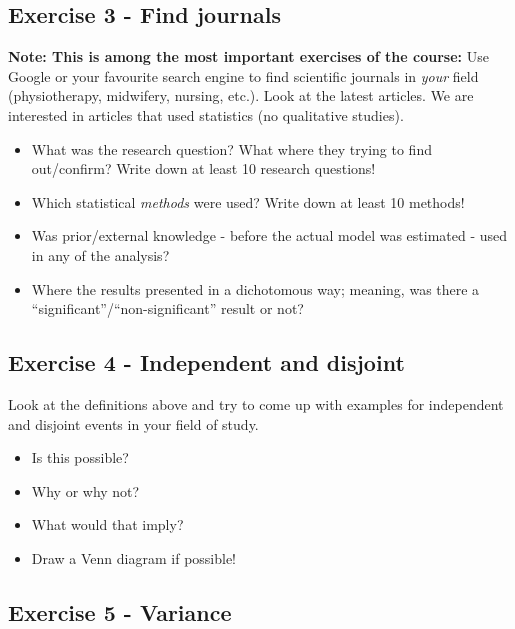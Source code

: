 \documentclass[
]{book}
\providecommand{\tightlist}{%
  \setlength{\itemsep}{0pt}\setlength{\parskip}{0pt}}
\begin{document}
\subsection{Exercise 3 - Find journals}\label{exercise3}

\textbf{Note: This is among the most important exercises of the course:}
Use Google or your favourite search engine to find scientific journals in \emph{your} field (physiotherapy, midwifery, nursing, etc.).
Look at the latest articles. We are interested in articles that used statistics (no qualitative studies).

\begin{itemize}
\tightlist
\item
  What was the research question? What where they trying to find out/confirm? Write down at least 10 research questions!
\item
  Which statistical \emph{methods} were used? Write down at least 10 methods!
\item
  Was prior/external knowledge - before the actual model was estimated - used in any of the analysis?
\item
  Where the results presented in a dichotomous way; meaning, was there a ``significant''/``non-significant'' result or not?
\end{itemize}

\subsection{Exercise 4 - Independent and disjoint}\label{exercise4}

Look at the definitions above and try to come up with examples for independent and disjoint events in your field of study.

\begin{itemize}
\tightlist
\item
  Is this possible?
\item
  Why or why not?
\item
  What would that imply?
\item
  Draw a Venn diagram if possible!
\end{itemize}

\subsection{Exercise 5 - Variance}\label{exercise5}
\end{document}
